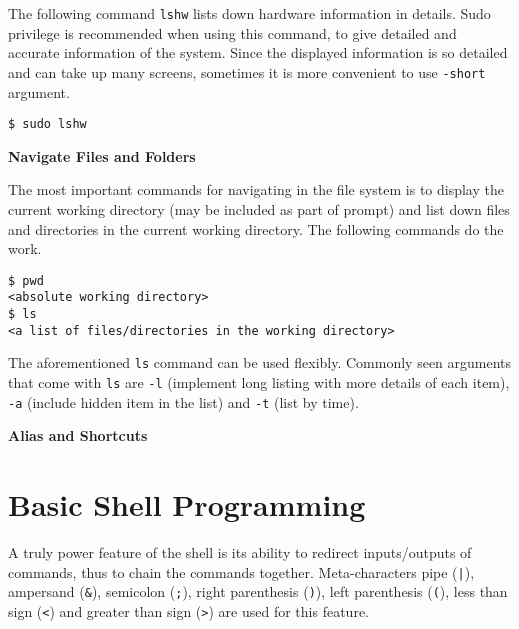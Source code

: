 The following command \verb|lshw| lists down hardware information in details. Sudo privilege is recommended when using this command, to give detailed and accurate information of the system. Since the displayed information is so detailed and can take up many screens, sometimes it is more convenient to use \verb|-short| argument.
\begin{verbatim}
$ sudo lshw
\end{verbatim}



\vspace{0.1in}
\noindent \textbf{Navigate Files and Folders}
\vspace{0.1in}

The most important commands for navigating in the file system is to display the current working directory (may be included as part of prompt) and list down files and directories in the current working directory. The following commands do the work.
\begin{verbatim}
$ pwd
<absolute working directory>
$ ls
<a list of files/directories in the working directory>
\end{verbatim}

The aforementioned \verb|ls| command can be used flexibly. Commonly seen arguments that come with \verb|ls| are \verb|-l| (implement long listing with more details of each item), \verb|-a| (include hidden item in the list) and \verb|-t| (list by time).

\vspace{0.1in}
\noindent \textbf{Alias and Shortcuts}
\vspace{0.1in}

\section{Basic Shell Programming}

A truly power feature of the shell is its ability to redirect inputs/outputs of commands, thus to chain the commands together. Meta-characters pipe (\verb$|$), ampersand (\verb|&|), semicolon (\verb|;|), right parenthesis (\verb|)|), left parenthesis (\verb|(|), less than sign (\verb|<|) and greater than sign (\verb|>|) are used for this feature.  











